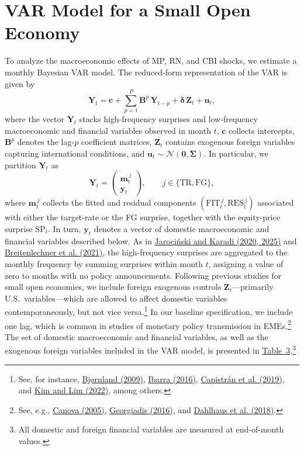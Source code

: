 \documentclass[\latexroot/\projectname]{subfiles}
\begin{document}
\section{VAR Model for a Small Open Economy}
\whenintegrated{\label{sec:parameters}}

To analyze the macroeconomic effects of MP, RN, and CBI shocks, we estimate a monthly Bayesian VAR model. The reduced-form representation of the VAR is given by
\begin{equation}
  \boldsymbol{Y}_t
  = \boldsymbol{c}
  + \sum_{p=1}^{P} \boldsymbol{B}^{p}\,\boldsymbol{Y}_{t-p}
  + \boldsymbol{\delta}\,\boldsymbol{Z}_t
  + \boldsymbol{u}_t ,
\end{equation}
where the vector $\boldsymbol{Y}_t$ stacks high-frequency surprises and low-frequency macroeconomic and financial variables observed in month $t$, $\boldsymbol{c}$ collects intercepts, $\boldsymbol{B}^{p}$ denotes the lag-$p$ coefficient matrices, $\boldsymbol{Z}_t$ contains exogenous foreign variables capturing international conditions, and $\boldsymbol{u}_t \sim \mathcal{N}\!\left(\mathbf{0},\boldsymbol{\Sigma}\right)$. In particular, we partition $\boldsymbol{Y}_t$ as
\[
\boldsymbol{Y}_t =
\begin{pmatrix}
\boldsymbol{m}_t^{\,j} \\
\boldsymbol{y}_t
\end{pmatrix},
\qquad j \in \{\text{TR}, \text{FG}\},
\]
where $\boldsymbol{m}_t^{\,j}$ collects the fitted and residual components $(\text{FIT}_t^{\,j}, \text{RES}_t^{\,j})$ associated with either the target-rate or the FG surprise, together with the equity-price surprise $\text{SP}_t$. In turn, $\boldsymbol{y}_t$ denotes a vector of domestic macroeconomic and financial variables described below. As in \hyperlink{JK (2020)}{Jarociński and Karadi (2020, 2025)} and \hyperlink{Breitenlechner (2021)}{Breitenlechner et al. (2021)}, the high-frequency surprises are aggregated to the monthly frequency by summing surprises within month $t$, assigning a value of zero to months with no policy announcements. Following previous studies for small open economies, we include foreign exogenous controls $\boldsymbol{Z}_t$—primarily U.S.\ variables—which are allowed to affect domestic variables contemporaneously, but not vice versa.\footnote{See, for instance, \hyperlink{Bjørnland (2009)}{Bjørnland (2009)}, \hyperlink{Ibarra (2016)}{Ibarra (2016)}, \hyperlink{Capistrán et al. (2019)}{Capistrán et al. (2019)}, and \hyperlink{Kim and Lim (2022)}{Kim and Lim (2022)}, among others.} In our baseline specification, we include one lag, which is common in studies of monetary policy transmission in EMEs.\footnote{See, e.g., \hyperlink{Canova (2005)}{Canova (2005)}, \hyperlink{Georgiadis (2016)}{Georgiadis (2016)}, and \hyperlink{Dahlhaus et al. (2018)}{Dahlhaus et al. (2018)}.} The set of domestic macroeconomic and financial variables, as well as the exogenous foreign variables included in the VAR model, is presented in \hyperlink{Table 3}{Table~3}.\footnote{All domestic and foreign financial variables are measured at end-of-month values.}
\end{document}
